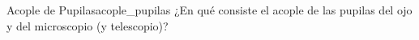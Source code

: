 \begin{problem}{Acople de Pupilas}{acople_pupilas}
¿En qué consiste el acople de las pupilas del ojo y del microscopio (y telescopio)?
\end{problem}